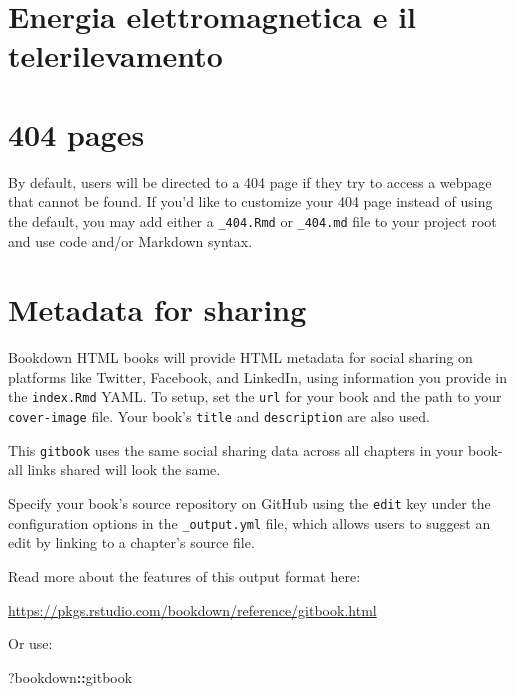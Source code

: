 \documentclass[
]{book}
\newenvironment{Shaded}{\begin{snugshade}}{\end{snugshade}}
\newcommand{\NormalTok}[1]{#1}
\newcommand{\SpecialCharTok}[1]{\textcolor[rgb]{0.81,0.36,0.00}{\textbf{#1}}}
\theoremstyle{definition}
\theoremstyle{definition}
\theoremstyle{definition}
\theoremstyle{definition}
\theoremstyle{remark}
\begin{document}
\hypertarget{energia-elettromagnetica-e-il-telerilevamento}{%
\section{Energia elettromagnetica e il telerilevamento}\label{energia-elettromagnetica-e-il-telerilevamento}}

\hypertarget{pages}{%
\section{404 pages}\label{pages}}

By default, users will be directed to a 404 page if they try to access a webpage that cannot be found. If you'd like to customize your 404 page instead of using the default, you may add either a \texttt{\_404.Rmd} or \texttt{\_404.md} file to your project root and use code and/or Markdown syntax.

\hypertarget{metadata-for-sharing}{%
\section{Metadata for sharing}\label{metadata-for-sharing}}

Bookdown HTML books will provide HTML metadata for social sharing on platforms like Twitter, Facebook, and LinkedIn, using information you provide in the \texttt{index.Rmd} YAML. To setup, set the \texttt{url} for your book and the path to your \texttt{cover-image} file. Your book's \texttt{title} and \texttt{description} are also used.

This \texttt{gitbook} uses the same social sharing data across all chapters in your book- all links shared will look the same.

Specify your book's source repository on GitHub using the \texttt{edit} key under the configuration options in the \texttt{\_output.yml} file, which allows users to suggest an edit by linking to a chapter's source file.

Read more about the features of this output format here:

\url{https://pkgs.rstudio.com/bookdown/reference/gitbook.html}

Or use:

\begin{Shaded}
\begin{Highlighting}[]
\NormalTok{?bookdown}\SpecialCharTok{::}\NormalTok{gitbook}
\end{Highlighting}
\end{Shaded}
\end{document}
